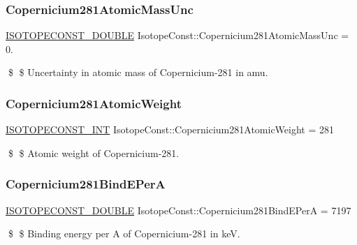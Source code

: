 \subsubsection{\texorpdfstring{Copernicium281\+Atomic\+Mass\+Unc}{Copernicium281AtomicMassUnc}}
{\footnotesize\ttfamily \mbox{\hyperlink{group___isotope_const-_macros_ga8f45a7272ce02c0b4c65c44636ed719a}{I\+S\+O\+T\+O\+P\+E\+C\+O\+N\+S\+T\+\_\+\+D\+O\+U\+B\+LE}} Isotope\+Const\+::\+Copernicium281\+Atomic\+Mass\+Unc = 0.}

\$ \$ Uncertainty in atomic mass of Copernicium-\/281 in amu. \mbox{\label{group___isotope_const-_copernicium-_cn281_gac36a023c2ebe66de2dd86026393e089f}} 
\subsubsection{\texorpdfstring{Copernicium281\+Atomic\+Weight}{Copernicium281AtomicWeight}}
{\footnotesize\ttfamily \mbox{\hyperlink{group___isotope_const-_macros_ga5f18360b3e99483a35c32d789e62621c}{I\+S\+O\+T\+O\+P\+E\+C\+O\+N\+S\+T\+\_\+\+I\+NT}} Isotope\+Const\+::\+Copernicium281\+Atomic\+Weight = 281}

\$ \$ Atomic weight of Copernicium-\/281. \mbox{\label{group___isotope_const-_copernicium-_cn281_ga5082f4cb269d1d156afe6e45df5e719f}} 
\subsubsection{\texorpdfstring{Copernicium281\+Bind\+E\+PerA}{Copernicium281BindEPerA}}
{\footnotesize\ttfamily \mbox{\hyperlink{group___isotope_const-_macros_ga8f45a7272ce02c0b4c65c44636ed719a}{I\+S\+O\+T\+O\+P\+E\+C\+O\+N\+S\+T\+\_\+\+D\+O\+U\+B\+LE}} Isotope\+Const\+::\+Copernicium281\+Bind\+E\+PerA = 7197}

\$ \$ Binding energy per A of Copernicium-\/281 in keV. \mbox{\label{group___isotope_const-_copernicium-_cn281_gac2dc3d052994d09dc305eef9587a7f93}} 
